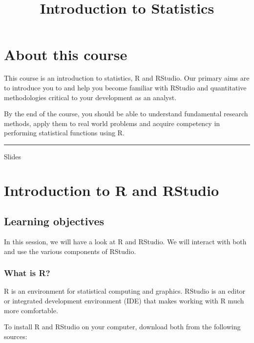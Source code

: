 \documentclass[]{article}
\title{Introduction to Statistics}
\author{}
\date{}
\begin{document}
\maketitle

{
\setcounter{tocdepth}{2}
\tableofcontents
}
\hypertarget{about-this-course}{%
\section*{About this course}\label{about-this-course}}

This course is an introduction to statistics, R and RStudio. Our primary aims are to introduce you to and help you become familiar with RStudio and quantitative methodologies critical to your development as an analyst.

By the end of the course, you should be able to understand fundamental research methods, apply them to real world problems and acquire competency in performing statistical functions using R.

\begin{center}\rule{0.5\linewidth}{\linethickness}\end{center}

Slides

\hypertarget{introduction-to-r-and-rstudio}{%
\section{Introduction to R and RStudio}\label{introduction-to-r-and-rstudio}}

\hypertarget{learning-objectives}{%
\subsection{Learning objectives}\label{learning-objectives}}

In this session, we will have a look at R and RStudio. We will interact with both and use the various components of RStudio.

\hypertarget{what-is-r}{%
\subsubsection{What is R?}\label{what-is-r}}

R is an environment for statistical computing and graphics. RStudio is an editor or integrated development environment (IDE) that makes working with R much more comfortable.

To install R and RStudio on your computer, download both from the following sources:
\end{document}
